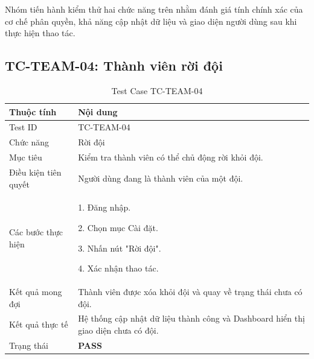 Nhóm tiến hành kiểm thử hai chức năng trên nhằm đánh giá tính chính xác của cơ chế phân quyền, khả năng cập nhật dữ liệu và giao diện người dùng sau khi thực hiện thao tác.

\subsection{TC-TEAM-04: Thành viên rời đội}

\begin{table}[H]
	\centering
	\caption{Test Case TC-TEAM-04}
	\label{tab:tc-team04}
	\renewcommand{\arraystretch}{1.3}
	
	\begin{tabular}{|p{4cm}|p{10cm}|}
		
		\hline
		\textbf{Thuộc tính} &
		\textbf{Nội dung}
		\\ \hline
		
		Test ID &
		TC-TEAM-04
		\\ \hline
		
		Chức năng &
		Rời đội
		\\ \hline
		
		Mục tiêu &
		Kiểm tra thành viên có thể chủ động rời khỏi đội.
		\\ \hline
		
		Điều kiện tiên quyết &
		Người dùng đang là thành viên của một đội.
		\\ \hline
		
		Các bước thực hiện &
		1. Đăng nhập.
		
		2. Chọn mục Cài đặt.
		
		3. Nhấn nút "Rời đội".
		
		4. Xác nhận thao tác.
		\\ \hline
		
		Kết quả mong đợi &
		Thành viên được xóa khỏi đội và quay về trạng thái chưa có đội.
		\\ \hline
		
		Kết quả thực tế &
		Hệ thống cập nhật dữ liệu thành công và Dashboard hiển thị giao diện chưa có đội.
		\\ \hline
		
		Trạng thái &
		\textbf{PASS}
		\\ \hline
		
	\end{tabular}
	
\end{table}

